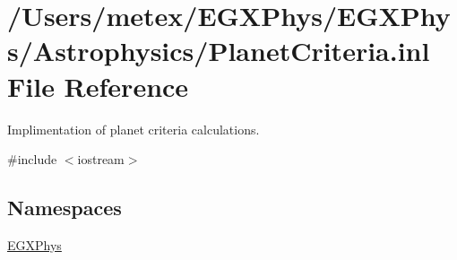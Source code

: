 \hypertarget{_planet_criteria_8inl}{}\section{/\+Users/metex/\+E\+G\+X\+Phys/\+E\+G\+X\+Phys/\+Astrophysics/\+Planet\+Criteria.inl File Reference}
\label{_planet_criteria_8inl}


Implimentation of planet criteria calculations.  


{\ttfamily \#include $<$iostream$>$}\newline
\subsection*{Namespaces}
\begin{DoxyCompactItemize}
\item 
 \hyperlink{namespace_e_g_x_phys}{E\+G\+X\+Phys}
\end{DoxyCompactItemize}
